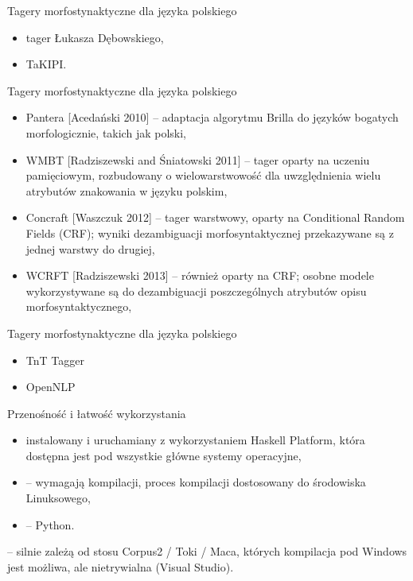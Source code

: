 \documentclass{beamer}
\begin{document}
\begin{frame}{Tagery morfostynaktyczne dla języka polskiego}
\begin{itemize}
\item tager Łukasza Dębowskiego,
\item TaKIPI.
\end{itemize}
\end{frame}

\begin{frame}{Tagery morfostynaktyczne dla języka polskiego}
\begin{itemize}
\item Pantera [Acedański 2010] -- adaptacja algorytmu Brilla do języków bogatych morfologicznie, takich jak polski,
\item WMBT [Radziszewski and Śniatowski 2011] -- tager oparty na uczeniu pamięciowym, rozbudowany o wielowarstwowość dla uwzględnienia wielu atrybutów znakowania w języku polskim,
\item Concraft [Waszczuk 2012] -- tager warstwowy, oparty na Conditional Random Fields (CRF); wyniki dezambiguacji morfosyntaktycznej przekazywane są z jednej warstwy do drugiej,
\item WCRFT [Radziszewski 2013] -- również oparty na CRF; osobne modele wykorzystywane są do dezambiguacji poszczególnych atrybutów opisu morfosyntaktycznego,
\end{itemize}
\end{frame}

\begin{frame}{Tagery morfostynaktyczne dla języka polskiego}
\begin{itemize}
\item TnT Tagger
\item OpenNLP
\end{itemize}
\end{frame}

\begin{frame}{Przenośność i łatwość wykorzystania}
  \begin{itemize}
    \item {} instalowany i uruchamiany z wykorzystaniem Haskell Platform, która dostępna jest pod wszystkie główne systemy operacyjne,
    \item {} -- wymagają kompilacji, proces kompilacji dostosowany do środowiska Linuksowego,
    \item {} -- Python.
  \end{itemize}
  \vspace{1cm}

   -- silnie zależą od stosu Corpus2 / Toki / Maca, których kompilacja pod Windows jest możliwa, ale nietrywialna (Visual Studio).
\end{frame}
\end{document}

